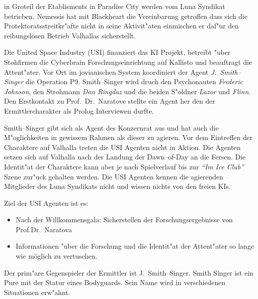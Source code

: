 in Gro\3teil der Etablisments in Paradise City werden vom Luna Syndikat betrieben. Nemessis hat mit Blackheart die Vereinbarung getroffen dass sich die Protektoratsstreitkr"afte nicht in seine Aktivit"aten einmischen er daf"ur den reibungslosen Betrieb Valhallas sicherstellt.


\newpage
{}

Die United Space Industry (USI) finanziert das KI Projekt, betreibt "uber Stohfirmen die Cyberbrain Forschungseinrichtung auf Kallisto und beauftragt die Attent"ater. Vor Ort im jovianischen System koordiniert der Agent \emph{J.~Smith--Singer} die Operation P9. Smith--Singer wird druch den Psychonauten \emph{Frederic Johnson}, den Strohmann \emph{Dan Ringdaz} und die beiden S"oldner \emph{Lazor} und \emph{Flinn}. Den Erstkontakt zu Prof.~Dr.~Naratove stellte ein Agent her den der Ermittlercharakter als Prolog Interviewen durfte.

Smith--Singer gibt sich als Agent des Konzernrat aus und hat auch die M"oglichkeiten in gewissem Rahmen als dieser zu agieren. Vor dem Eintreffen der Charaktere auf Valhalla treten die USI Agenten nicht in Aktion. Die Agenten setzen sich auf Valhalla nach der Landung der Dawn--of-Day an die Fersen. Die Identit"at der Charaktere kann aber je nach Spielverlauf bis zur \emph{"`Im Ice Club"'} Szene zur"uck gehalten werden. Die USI Agenten kennen die agierenden Mitglieder des Luna Syndikats nicht und wissen nichts von den freien KIs.

Ziel der USI Agenten ist es:

\begin{itemize}
    \item Nach der Willkommensgala: Sicherstellen der Forschungsergebnisse von Prof.Dr.~Naratova
    \item Informationen "uber die Forschung und die Identit"at der Attent"ater so lange wie möglich zu vertuschen.    
\end{itemize}

Der prim"are Gegenspieler der Ermittler ist J.~Smith--Singer. Smith Singer ist ein Pure mit der Statur eines Bodyguards. Sein Name wird in verschiedenen Situationen erw"ahnt.
\vfill
\pagebreak

